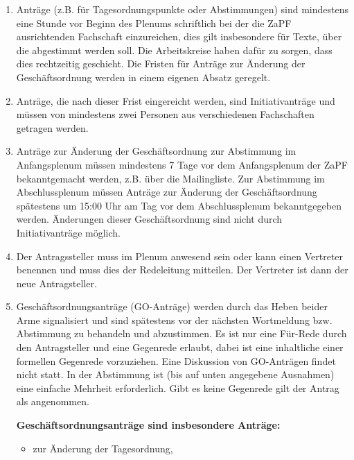 \documentclass[draft,12pt,oneside]{scrreprt}
\begin{document}
\begin{enumerate}
  \item Anträge (z.B. für Tagesordnungspunkte oder Abstimmungen) sind mindestens
        eine Stunde vor Beginn des Plenums schriftlich bei der die ZaPF
        ausrichtenden Fachschaft einzureichen, dies gilt insbesondere für Texte,
        über die abgestimmt werden soll.
        Die Arbeitskreise haben dafür zu sorgen, dass dies rechtzeitig geschieht.
        Die Fristen für Anträge zur Änderung der Geschäftsordnung werden in einem
        eigenen Absatz geregelt.

  \item Anträge, die nach dieser Frist eingereicht werden, sind Initiativanträge
        und müssen von mindestens zwei Personen aus verschiedenen Fachschaften
        getragen werden.

  \item Anträge zur Änderung der Geschäftsordnung zur Abstimmung im Anfangsplenum
        müssen mindestens 7 Tage vor dem
        Anfangsplenum der ZaPF bekanntgemacht werden, z.B. über die Mailingliste.
        Zur Abstimmung im Abschlussplenum müssen Anträge zur Änderung der
        Geschäftsordnung spätestens um 15:00 Uhr am Tag vor dem Abschlussplenum
        bekanntgegeben werden.
        Änderungen dieser Geschäftsordnung sind nicht durch Initiativanträge möglich.

  \item Der Antragssteller muss im Plenum anwesend sein oder kann einen Vertreter
        benennen und muss dies der Redeleitung mitteilen.
        Der Vertreter ist dann der neue Antragsteller.

  \item Geschäftsordnungsanträge (GO-Anträge) werden durch das Heben beider Arme
        signalisiert und sind spätestens vor der nächsten Wortmeldung bzw.
        Abstimmung zu behandeln und abzustimmen.
        Es ist nur eine Für-Rede durch den Antragsteller und eine Gegenrede
        erlaubt, dabei ist eine inhaltliche einer formellen Gegenrede vorzuziehen.
        Eine Diskussion von GO-Anträgen findet nicht statt.
        In der Abstimmung ist (bis auf unten angegebene Ausnahmen) eine einfache
        Mehrheit erforderlich.
        Gibt es keine Gegenrede gilt der Antrag als angenommen.

    \textbf{Geschäftsordnungsanträge sind insbesondere Anträge:}
    \begin{itemize}
      \item zur Änderung der Tagesordnung,


\end{itemize}
\end{enumerate}
\end{document}
